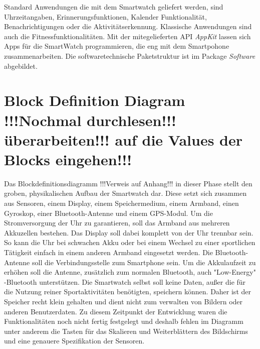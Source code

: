 Standard Anwendungen die mit dem Smartwatch geliefert werden, sind Uhrzeitangaben, Erinnerungsfunktionen, Kalender Funktionalität, Benachrichtigungen oder die Aktivitätserkennung. Klassische Anwendungen sind auch die Fitnessfunktionalitäten.
Mit der mitegelieferten API \textit{AppKit} lassen sich Apps für die SmartWatch programmieren, die eng mit dem Smartpohone zusammenarbeiten.
Die softwaretechnische Paketstruktur ist im Package \textit{Software} abgebildet.

\section{Block Definition Diagram !!!Nochmal durchlesen!!!überarbeiten!!! auf die Values der Blocks eingehen!!!}
Das Blockdefinitionsdiagramm !!!Verweis auf Anhang!!! in dieser Phase stellt den groben, physikalischen Aufbau der Smartwatch dar. Diese setzt sich zusammen aus Sensoren, einem Display, einem Speichermedium, einem Armband, einen Gyroskop, einer Bluetooth-Antenne und einem GPS-Modul. Um die Stromversorgung der Uhr zu garantieren, soll das Armband aus mehreren Akkuzellen bestehen. Das Display soll dabei komplett von der Uhr trennbar sein. So kann die Uhr bei schwachen Akku oder bei einem Wechsel zu einer sportlichen Tätigkeit einfach in einem anderen Armband eingesetzt werden. Die Bluetooth-Antenne soll die Verbindungsstelle zum Smartphone sein. Um die Akkulaufzeit zu erhöhen soll die Antenne, zusätzlich zum normalen Bluetooth, auch "Low-Energy" -Bluetooth unterstützen. Die Smartwatch selbst soll keine Daten, außer die für die Nutzung reiner Sportaktivitäten benötigten, speichern können. Daher ist der Speicher recht klein gehalten und dient nicht zum verwalten von Bildern oder anderen Benutzerdaten.
Zu diesem Zeitpunkt der Entwicklung waren die Funktionalitäten noch nicht fertig festgelegt und deshalb fehlen im Diagramm unter anderem die Tasten für das Skalieren und Weiterblättern des Bildschirms und eine genauere Spezifikation der Sensoren.
